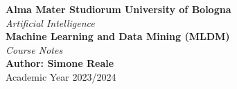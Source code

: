 \begin{titlepage}
    \centering
    \vspace*{\fill}
    {\LARGE \textbf{Alma Mater Studiorum University of Bologna}}\\[0.5cm]
    {\Large \textit{Artificial Intelligence}}\\[1.5cm]
    {\Huge \textbf{Machine Learning and Data Mining (MLDM)}}\\[1cm]
    {\LARGE \textit{Course Notes}}\\[10cm]
    {\large \textbf{Author: Simone Reale}}\\[0.5cm]
    {\large Academic Year 2023/2024}
    \vspace*{\fill}
\end{titlepage}
